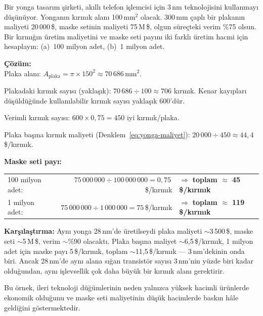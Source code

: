 \begin{ornek}[1.2]
Bir yonga tasarım şirketi, akıllı telefon işlemcisi için 3\,nm teknolojisini kullanmayı düşünüyor. Yonganın kırmık alanı 100\,mm$^2$ olacak. 300\,mm çaplı bir plakanın maliyeti 20\,000\,\$, maske setinin maliyeti 75\,M\,\$, olgun süreçteki verim \%75 olsun. Bir kırmığın üretim maliyetini ve maske seti payını iki farklı üretim hacmi için hesaplayın: (a)~100 milyon adet, (b)~1 milyon adet.

\textbf{Çözüm:}\\
Plaka alanı: $A_\text{plaka} = \pi \times 150^2 \approx 70\,686$\,mm$^2$.

Plakadaki kırmık sayısı (yaklaşık): $70\,686 \div 100 \approx 706$ kırmık. Kenar kayıpları düşüldüğünde kullanılabilir kırmık sayısı yaklaşık 600'dür.

Verimli kırmık sayısı: $600 \times 0{,}75 = 450$ iyi kırmık/plaka.

Plaka başına kırmık maliyeti (Denklem~\ref{eq:yonga-maliyet}): $20\,000 \div 450 \approx 44{,}4$\,\$/kırmık.

\medskip
\textbf{Maske seti payı:}

\smallskip
\begin{tabular}{@{}lrl@{}}
100 milyon adet: & $75\,000\,000 \div 100\,000\,000 = 0{,}75$\,\$/kırmık & $\Rightarrow$ \textbf{toplam $\approx$ 45\,\$/kırmık} \\[4pt]
1 milyon adet:   & $75\,000\,000 \div 1\,000\,000 = 75$\,\$/kırmık     & $\Rightarrow$ \textbf{toplam $\approx$ 119\,\$/kırmık}
\end{tabular}

\medskip
\textbf{Karşılaştırma:} Aynı yonga 28\,nm'de üretilseydi plaka maliyeti ${\sim}$3\,500\,\$, maske seti ${\sim}$5\,M\,\$, verim ${\sim}$\%90 olacaktı. Plaka başına maliyet ${\sim}$6{,}5\,\$/kırmık, 1 milyon adet için maske payı 5\,\$/kırmık, toplam ${\sim}$11{,}5\,\$/kırmık --- 3\,nm'dekinin onda biri. Ancak 28\,nm'de aynı alana sığan transistör sayısı 3\,nm'nin yüzde biri kadar olduğundan, aynı işlevsellik çok daha büyük bir kırmık alanı gerektirir.

Bu örnek, ileri teknoloji düğümlerinin neden yalnızca yüksek hacimli ürünlerde ekonomik olduğunu ve maske seti maliyetinin düşük hacimlerde baskın hâle geldiğini göstermektedir.
\end{ornek}

